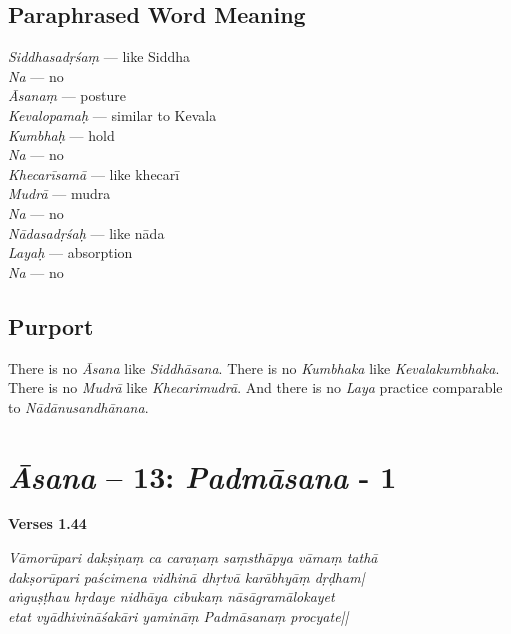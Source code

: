 \subsection*{Paraphrased Word Meaning}

\begin{multicols}{2}
\itemsep=0pt
\textit{Siddhasadṛśaṃ} --- like Siddha \\
\textit{Na} --- no \\
\textit{Āsanaṃ} --- posture  \\
\textit{Kevalopamaḥ} --- similar to Kevala  \\
\textit{Kumbhaḥ} ---  hold  \\
\textit{Na} --- no \\
\textit{Khecarīsamā} --- like khecarī   \\
\textit{Mudrā} --- mudra \\
\textit{Na} ---  no	 \\		
\textit{Nādasadṛśaḥ} --- like nāda	 \\
\textit{Layaḥ} --- absorption  \\
\textit{Na} --- no
\end{multicols}

\subsection*{Purport}

There is no \textit{Āsana} like \textit{Siddhāsana}. There is no \textit{Kumbhaka} like \textit{Kevalakumbhaka}. There is no \textit{Mudrā} like \textit{Khecarimudrā}. And there is no \textit{Laya} practice comparable to \textit{Nādānusandhānana}.
\newpage

\section*{\textit{Āsana} -- 13: \textit{Padmāsana} - 1}

\noindent \textbf{Verses 1.44}

\begin{shloka}
\textit{Vāmorūpari dakṣiṇaṃ ca caraṇaṃ saṃsthāpya vāmaṃ tathā\\
dakṣorūpari paścimena vidhinā dhṛtvā karābhyāṃ dṛḍham|\\
aṅguṣṭhau hṛdaye nidhāya cibukaṃ nāsāgramālokayet\\
etat vyādhivināśakāri yamināṃ Padmāsanaṃ procyate||}
\end{shloka}
\vspace{-10pt}

